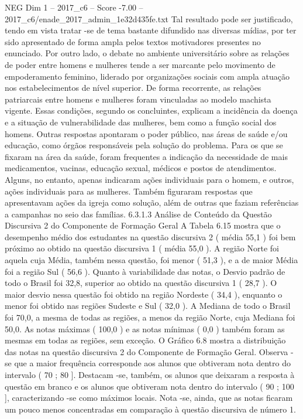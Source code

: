 \begin{textsample}{NEG Dim 1 – 2017\_c6 – Score -7.00 – 2017\_c6/enade\_2017\_admin\_1e32d435fe.txt}
Tal resultado pode ser justificado, tendo em vista tratar -se de tema bastante difundido nas diversas mídias, por ter sido apresentado de forma ampla pelos textos motivadores presentes no enunciado.
Por outro lado, o debate no ambiente universitário sobre as relações de poder entre homens e mulheres tende a ser marcante pelo movimento de empoderamento feminino, liderado por organizações sociais com ampla atuação nos estabelecimentos de nível superior.
De forma recorrente, as relações patriarcais entre homens e mulheres foram vinculadas ao modelo machista vigente.
Essas condições, segundo os concluintes, explicam a incidência da doença e a situação de vulnerabilidade das mulheres, bem como a função social dos homens.
Outras respostas apontaram o poder público, nas áreas de saúde e/ou educação, como órgãos responsáveis pela solução do problema.
Para os que se fixaram na área da saúde, foram frequentes a indicação da necessidade de mais medicamentos, vacinas, educação sexual, médicos e postos de atendimentos.
Alguns, no entanto, apenas indicaram ações individuais para o homem, e outros, ações individuais para as mulheres.
Também figuraram respostas que apresentavam ações da igreja como solução, além de outras que faziam referências a campanhas no seio das famílias. 6.3.1.3 Análise de Conteúdo da Questão Discursiva 2 do Componente de Formação Geral A Tabela 6.15 mostra que o desempenho médio dos estudantes na questão discursiva 2 ( média 55,1 ) foi bem próximo ao obtido na questão discursiva 1 ( média 55,0 ).
A região Norte foi aquela cuja Média, também nessa questão, foi menor ( 51,3 ), e a de maior Média foi a região Sul ( 56,6 ).
Quanto à variabilidade das notas, o Desvio padrão de todo o Brasil foi 32,8, superior ao obtido na questão discursiva 1 ( 28,7 ).
O maior desvio nessa questão foi obtido na região Nordeste ( 34,4 ), enquanto o menor foi obtido nas regiões Sudeste e Sul ( 32,0 ).
A Mediana de todo o Brasil foi 70,0, a mesma de todas as regiões, a menos da região Norte, cuja Mediana foi 50,0.
As notas máximas ( 100,0 ) e as notas mínimas ( 0,0 ) também foram as mesmas em todas as regiões, sem exceção.
O Gráfico 6.8 mostra a distribuição das notas na questão discursiva 2 do Componente de Formação Geral.
Observa -se que a maior frequência corresponde aos alunos que obtiveram nota dentro do intervalo ( 70 ; 80 ].
Destacam -se, também, os alunos que deixaram a resposta à questão em branco e os alunos que obtiveram nota dentro do intervalo ( 90 ; 100 ], caracterizando -se como máximos locais.
Nota -se, ainda, que as notas ficaram um pouco menos concentradas em comparação à questão discursiva de número 1.

\end{textsample}
